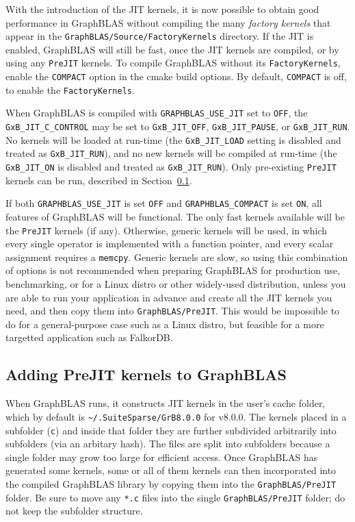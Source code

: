 With the introduction of the JIT kernels, it is now possible to obtain good
performance in GraphBLAS without compiling the many {\em factory kernels} that
appear in the \verb'GraphBLAS/Source/FactoryKernels' directory.  If the JIT is
enabled, GraphBLAS will still be fast, once the JIT kernels are compiled, or by
using any \verb'PreJIT' kernels.  To compile GraphBLAS without its
\verb'FactoryKernels', enable the \verb'COMPACT' option in the cmake build
options.  By default, \verb'COMPACT' is off, to enable the
\verb'FactoryKernels'.

When GraphBLAS is compiled with \verb'GRAPHBLAS_USE_JIT' set to \verb'OFF', the
\verb'GxB_JIT_C_CONTROL' may be set to \verb'GxB_JIT_OFF',
\verb'GxB_JIT_PAUSE', or \verb'GxB_JIT_RUN'.  No kernels will be loaded at
run-time (the \verb'GxB_JIT_LOAD' setting is disabled and treated as
\verb'GxB_JIT_RUN'), and no new kernels will be compiled at run-time (the
\verb'GxB_JIT_ON' is disabled and treated as \verb'GxB_JIT_RUN').  Only
pre-existing \verb'PreJIT' kernels can be run, described in
Section~\ref{prejit}.

If both \verb'GRAPHBLAS_USE_JIT' is set \verb'OFF' and
\verb'GRAPHBLAS_COMPACT' is set \verb'ON', all features of GraphBLAS will be
functional.  The only fast kernels available will be the \verb'PreJIT' kernels
(if any).  Otherwise, generic kernels will be used, in which every single
operator is implemented with a function pointer, and every scalar assignment
requires a \verb'memcpy'.  Generic kernels are slow, so using this combination
of options is not recommended when preparing GraphBLAS for production use,
benchmarking, or for a Linux distro or other widely-used distribution, unless
you are able to run your application in advance and create all the JIT kernels
you need, and then copy them into \verb'GraphBLAS/PreJIT'.  This would be
impossible to do for a general-purpose case such as a Linux distro, but
feasible for a more targetted application such as FalkorDB.

\subsection{Adding {\sf PreJIT} kernels to GraphBLAS}
\label{prejit}

When GraphBLAS runs, it constructs JIT kernels in the user's cache folder,
which by default is \verb'~/.SuiteSparse/GrB8.0.0' for v8.0.0.  The
kernels placed in a subfolder (\verb'c') and inside that folder they are
further subdivided arbitrarily into subfolders (via an arbitary hash).  The
files are split into subfolders because a single folder may grow too large for
efficient access.  Once GraphBLAS has generated some kernels, some or all of
them kernels can then incorporated into the compiled GraphBLAS library by
copying them into the \verb'GraphBLAS/PreJIT' folder.  Be sure to move any
\verb'*.c' files into the single \verb'GraphBLAS/PreJIT' folder; do not keep
the subfolder structure.

